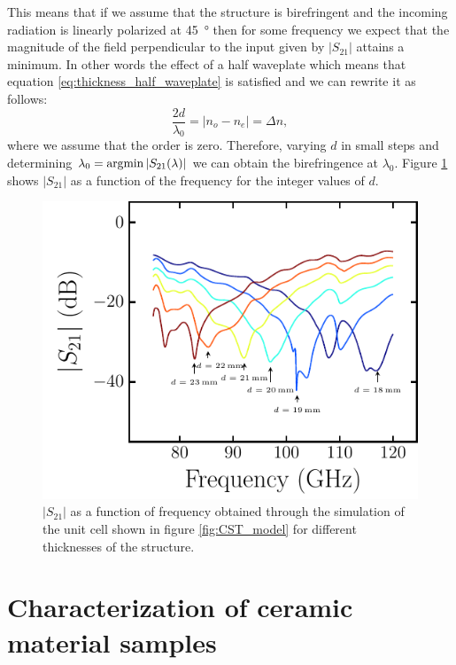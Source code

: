 This means that if we assume that the structure is birefringent and the incoming radiation is linearly polarized at \SI{45}{\degree} then for some frequency we expect that the magnitude of the field perpendicular to the input given by $|S_{21}|$ attains a minimum. In other words the effect of a half waveplate which means that equation \ref{eq:thickness_half_waveplate} is satisfied and we can rewrite it as follows:
\begin{equation}
    \frac{2d}{\lambda_0}=|n_o-n_e|=\Delta n,
\end{equation}
where we assume that the order is zero. Therefore, varying $d$ in small steps and determining $\lambda_0=\operatorname*{\arg\!\min}|S_{21}(\lambda)|$ we can obtain the birefringence at $\lambda_0$. Figure \ref{fig:bf_sim} shows $|S_{21}|$ as a function of the frequency for the integer values of $d$.

\begin{figure}[H]
    \centering
    \includegraphics[scale=1]{images/appendix/plots/cst_sim/bf_sim.pdf}
    \caption{$|S_{21}|$ as a function of frequency obtained through the simulation of the unit cell shown in figure \ref{fig:CST_model} for different thicknesses of the structure.}
    \label{fig:bf_sim}
\end{figure}

\section{Characterization of ceramic material samples}
\label{sec:ceramic_characterization}

